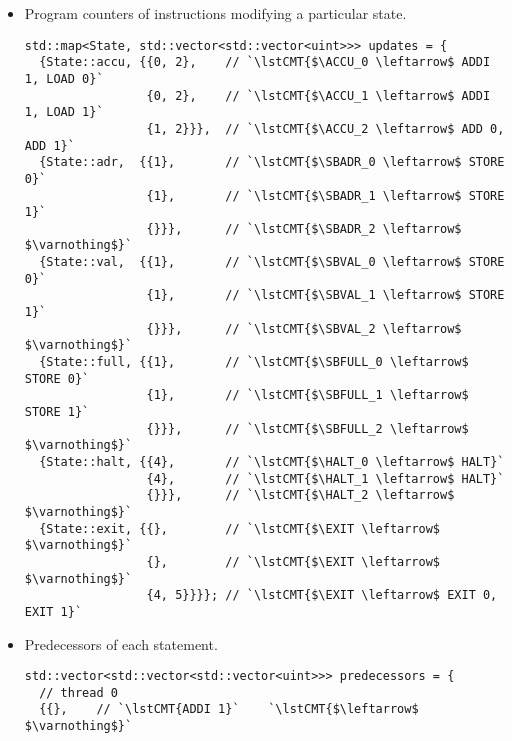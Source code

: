 \begin{itemize}
\item Program counters of instructions modifying a particular state.
\begin{lstlisting}[style=c++]
std::map<State, std::vector<std::vector<uint>>> updates = {
  {State::accu, {{0, 2},    // `\lstCMT{$\ACCU_0 \leftarrow$ ADDI 1, LOAD 0}`
                 {0, 2},    // `\lstCMT{$\ACCU_1 \leftarrow$ ADDI 1, LOAD 1}`
                 {1, 2}}},  // `\lstCMT{$\ACCU_2 \leftarrow$ ADD 0, ADD 1}`
  {State::adr,  {{1},       // `\lstCMT{$\SBADR_0 \leftarrow$ STORE 0}`
                 {1},       // `\lstCMT{$\SBADR_1 \leftarrow$ STORE 1}`
                 {}}},      // `\lstCMT{$\SBADR_2 \leftarrow$ $\varnothing$}`
  {State::val,  {{1},       // `\lstCMT{$\SBVAL_0 \leftarrow$ STORE 0}`
                 {1},       // `\lstCMT{$\SBVAL_1 \leftarrow$ STORE 1}`
                 {}}},      // `\lstCMT{$\SBVAL_2 \leftarrow$ $\varnothing$}`
  {State::full, {{1},       // `\lstCMT{$\SBFULL_0 \leftarrow$ STORE 0}`
                 {1},       // `\lstCMT{$\SBFULL_1 \leftarrow$ STORE 1}`
                 {}}},      // `\lstCMT{$\SBFULL_2 \leftarrow$ $\varnothing$}`
  {State::halt, {{4},       // `\lstCMT{$\HALT_0 \leftarrow$ HALT}`
                 {4},       // `\lstCMT{$\HALT_1 \leftarrow$ HALT}`
                 {}}},      // `\lstCMT{$\HALT_2 \leftarrow$ $\varnothing$}`
  {State::exit, {{},        // `\lstCMT{$\EXIT \leftarrow$ $\varnothing$}`
                 {},        // `\lstCMT{$\EXIT \leftarrow$ $\varnothing$}`
                 {4, 5}}}}; // `\lstCMT{$\EXIT \leftarrow$ EXIT 0, EXIT 1}`
\end{lstlisting}
\item Predecessors of each statement.
\begin{lstlisting}[style=c++]
std::vector<std::vector<std::vector<uint>>> predecessors = {
  // thread 0
  {{},    // `\lstCMT{ADDI 1}`    `\lstCMT{$\leftarrow$ $\varnothing$}`

\end{lstlisting}
\end{itemize}
